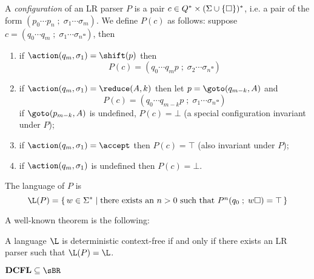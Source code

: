 \documentclass{llncs}
\begin{document}
\begin{definition}

    A \emph{configuration} of an LR parser $P$ is a pair $c\in Q^*\times(\Sigma\cup\set\square)^*$, i.e. a pair
    of the form $(p_0\cdots p_n\;;\;\sigma_1\cdots\sigma_m)$.
    We define $P(c)$ as follows: suppose $c=(q_0\cdots q_m\;;\;\sigma_1\cdots\sigma_n\square)$, then
    \begin{enumerate}
        \item if $\action(q_m,\sigma_1)=\shift(p)$ then
        $$ P(c) = (q_0\cdots q_mp\;;\;\sigma_2\cdots\sigma_n\square) $$
        \item if $\action(q_m,\sigma_1)=\reduce(A,k)$ then let $p=\goto(q_{m-k},A)$ and
        $$ P(c) = (q_0\cdots q_{m-k}p\;;\;\sigma_1\cdots\sigma_n\square) $$
        if $\goto(p_{m-k},A)$ is undefined, $P(c)=\bot$ (a special configuration invariant under $P$);
        \item if $\action(q_m,\sigma_1)=\accept$ then $P(c)=\top$ (also invariant under $P$);
        \item if $\action(q_m,\sigma_1)$ is undefined then $P(c)=\bot$.
    \end{enumerate}
    The language of $P$ is
    $$ \L(P) = \set{w\in\Sigma^*}[\hbox{there exists an $n>0$ such that $P^n(q_0\;;\;w\square)=\top$}] $$

\end{definition}

A well-known theorem is the following:

\begin{theorem}

    A language $\L$ is deterministic context-free if and only if there exists an LR parser such that $\L(P)=\L$.

\end{theorem}

\begin{lemma}

    $\DCFL\subseteq\sBR$

\end{lemma}
\end{document}
